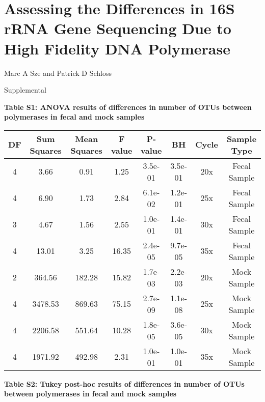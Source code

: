 \documentclass[11pt,]{article}
\title{}
\author{}
\date{}
\begin{document}
\section{Assessing the Differences in 16S rRNA Gene Sequencing Due to
High Fidelity DNA
Polymerase}\label{assessing-the-differences-in-16s-rrna-gene-sequencing-due-to-high-fidelity-dna-polymerase}

\vspace{10mm}

\begin{center}
Marc A Sze and Patrick D Schloss

\vspace{10mm}

Supplemental
\end{center}

\newpage

\textbf{Table S1: ANOVA results of differences in number of OTUs between
polymerases in fecal and mock samples}

\begin{longtable}[]{@{}cccccccc@{}}
\toprule
DF & Sum Squares & Mean Squares & F value & P-value & BH & Cycle &
Sample Type\tabularnewline
\midrule
\endhead
4 & 3.66 & 0.91 & 1.25 & 3.5e-01 & 3.5e-01 & 20x & Fecal
Sample\tabularnewline
4 & 6.90 & 1.73 & 2.84 & 6.1e-02 & 1.2e-01 & 25x & Fecal
Sample\tabularnewline
3 & 4.67 & 1.56 & 2.55 & 1.0e-01 & 1.4e-01 & 30x & Fecal
Sample\tabularnewline
4 & 13.01 & 3.25 & 16.35 & 2.4e-05 & 9.7e-05 & 35x & Fecal
Sample\tabularnewline
2 & 364.56 & 182.28 & 15.82 & 1.7e-03 & 2.2e-03 & 20x & Mock
Sample\tabularnewline
4 & 3478.53 & 869.63 & 75.15 & 2.7e-09 & 1.1e-08 & 25x & Mock
Sample\tabularnewline
4 & 2206.58 & 551.64 & 10.28 & 1.8e-05 & 3.6e-05 & 30x & Mock
Sample\tabularnewline
4 & 1971.92 & 492.98 & 2.31 & 1.0e-01 & 1.0e-01 & 35x & Mock
Sample\tabularnewline
\bottomrule
\end{longtable}

\newpage

\textbf{Table S2: Tukey post-hoc results of differences in number of
OTUs between polymerases in fecal and mock samples}
\end{document}
